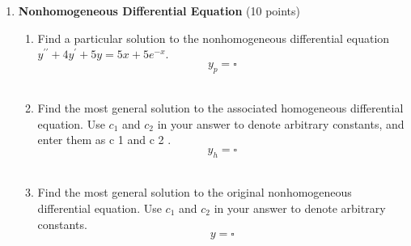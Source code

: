 \begin{enumerate}
  \item \textbf{Nonhomogeneous Differential Equation} (10 points)\\
  \begin{enumerate}[label=(\alph*)]
    \item Find a particular solution to the nonhomogeneous differential equation $y^{\prime \prime}+4 y^{\prime}+5 y=5 x+5 e^{-x}$.\\
    $$
    y_p=\square
    $$\\
    \begin{subanswer}
    \end{subanswer}
    \item Find the most general solution to the associated homogeneous differential equation. Use $c_1$ and $c_2$ in your answer to denote arbitrary constants, and enter them as c 1 and c 2 .\\
    $$
    y_h=\square
    $$\\
    \begin{subanswer}
    \end{subanswer}
    \item Find the most general solution to the original nonhomogeneous differential equation. Use $c_1$ and $c_2$ in your answer to denote arbitrary constants.\\
    $$
    y=\square
    $$\\
    \begin{subanswer}
    \end{subanswer}
  \end{enumerate}


\end{enumerate}
